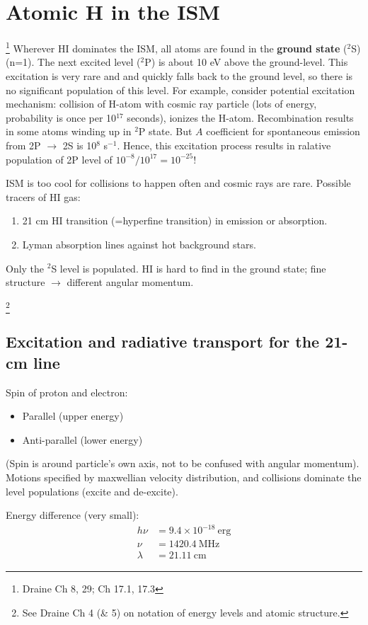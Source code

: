 \documentclass[12pt]{article}
\begin{document}
\section{Atomic H in the ISM}
\footnote{Draine Ch 8, 29; Ch 17.1, 17.3}
Wherever HI dominates the ISM, all atoms are found in the \textbf{ground state}
($^{2}$S)(n=1). The next excited level ($^{2}$P) is about 10 eV above the
ground-level. This excitation is very rare and and quickly falls back to
the ground level, so there is no significant population of this level.
For example, consider potential excitation mechanism: collision of H-atom
with cosmic ray particle (lots of energy, probability is once per
10$^{17}$ seconds), ionizes the H-atom. Recombination results in some
atoms winding up in $^{2}$P state. But $A$ coefficient for spontaneous
emission from 2P $\rightarrow$ 2S is 10$^{8}$ s$^{-1}$. Hence, this excitation
process results in ralative population of 2P level of
$10^{-8}/10^{17} = 10^{-25}$!

ISM is too cool for collisions to happen often and cosmic rays are rare.
Possible tracers of HI gas:
\begin{enumerate}
    \item 21 cm HI transition (=hyperfine transition) in emission or absorption.
    \item Lyman absorption lines against hot background stars.
\end{enumerate}
Only the $^{2}$S level is populated. HI is hard to find in the ground state;
fine structure $\rightarrow$ different angular momentum.

\footnote{See Draine Ch 4 (\& 5) on notation of energy levels and
atomic structure.}

\subsection{Excitation and radiative transport for the 21-cm line}
Spin of proton and electron:
\begin{itemize}
    \item Parallel (upper energy)
    \item Anti-parallel (lower energy)
\end{itemize}
(Spin is around particle's own axis, not to be confused with angular
momentum). Motions specified by maxwellian velocity distribution, and
collisions dominate the level populations (excite and de-excite).

Energy difference (very small):
\begin{align*}
    h\nu &= 9.4\times10^{-18}\:\mathrm{erg}\\
    \nu &= 1420.4\:\mathrm{MHz}\\
    \lambda &= 21.11\:\mathrm{cm}
\end{align*}
\end{document}
